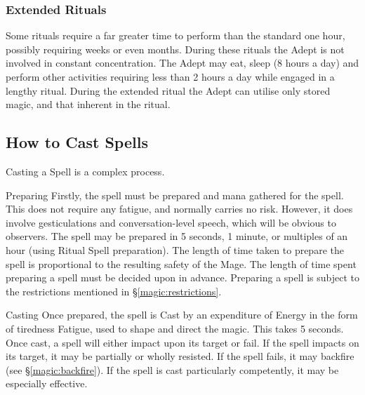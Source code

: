 \begin{multicols*}{3}
\subsubsection{Extended Rituals}
\label{magic:extendedrituals}

Some rituals require a far greater time to perform than the standard
one hour, possibly requiring weeks or even months. During these
rituals the Adept is not involved in constant concentration.  The
Adept may eat, sleep (8 hours a day) and perform other activities
requiring less than 2 hours a day while engaged in a lengthy ritual.
During the extended ritual the Adept can utilise only stored magic, and
that inherent in the ritual.

\subsection{How to Cast Spells}
\label{magic:casting}

Casting a Spell is a complex process.

\begin{Description}

\item[Preparing] Firstly, the spell must be prepared and mana gathered
for the spell. This does not require any fatigue, and normally carries
no risk. However, it does involve gesticulations and
conversation-level speech, which will be obvious to observers. The
spell may be prepared in 5 seconds, 1 minute, or multiples of an hour
(using Ritual Spell preparation). The length of time taken to prepare
the spell is proportional to the resulting safety of the Mage. The
length of time spent preparing a spell must be decided upon in
advance. Preparing a spell is subject to the restrictions mentioned in
\S\ref{magic:restrictions}.

\item[Casting] Once prepared, the spell is Cast by an expenditure of
Energy in the form of tiredness Fatigue, used to shape and direct the
magic. This takes 5 seconds. Once cast, a spell will either impact
upon its target or fail. If the spell impacts on its target, it may be
partially or wholly resisted. If the spell fails, it may backfire (see
\S\ref{magic:backfire}). If the spell is cast particularly competently,
it may be especially effective.

\end{Description}


\end{multicols*}
